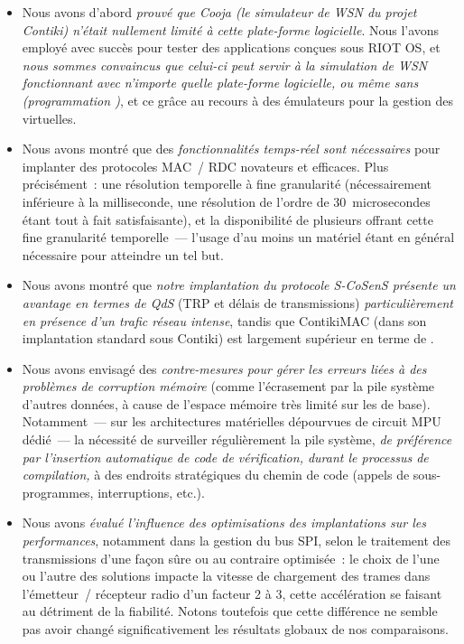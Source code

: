 \begin{itemize}

\item Nous avons d'abord \emph{prouvé que Cooja (le simulateur de WSN du
projet Contiki) n'était nullement limité à cette plate-forme logicielle}.
Nous l'avons employé avec succès pour tester des applications conçues sous
RIOT OS, et \emph{nous sommes convaincus que celui-ci peut servir à la
simulation de WSN fonctionnant avec n'importe quelle plate-forme logicielle,
ou même sans (programmation )}, et ce grâce au recours
à des émulateurs pour la gestion des  virtuelles.

\item Nous avons montré que des \emph{fonctionnalités temps-réel sont
nécessaires} pour implanter des protocoles MAC~/ RDC novateurs et
efficaces. Plus précisément~: une résolution temporelle à fine
granularité (nécessairement inférieure à la milliseconde, une résolution
de l'ordre de 30~microsecondes étant tout à fait satisfaisante), et la
disponibilité de plusieurs  offrant cette fine granularité
temporelle~--- l'usage d'au moins un  matériel étant en général
nécessaire pour atteindre un tel but.

\item Nous avons montré que \emph{notre implantation du protocole
S-CoSenS présente un avantage en termes de QdS} (TRP et délais de
transmissions) \emph{particulièrement en présence d'un trafic réseau
intense}, tandis que ContikiMAC (dans son implantation standard
sous Contiki) est largement supérieur en terme de .

\item Nous avons envisagé des \emph{contre-mesures pour gérer les erreurs
liées à des problèmes de corruption mémoire} (comme l'écrasement par
la pile système d'autres données, à cause de l'espace mémoire
très limité sur les  de base).
Notamment~--- sur les architectures matérielles dépourvues de circuit
MPU dédié~--- la nécessité de surveiller régulièrement la pile système,
\emph{de préférence par l'insertion automatique de code de vérification,
durant le processus de compilation,} à des endroits stratégiques du chemin
de code (appels de sous-programmes, interruptions, etc.).

\item Nous avons \emph{évalué l'influence des optimisations des
implantations sur les performances}, notamment dans la gestion du bus SPI,
selon le traitement des transmissions d'une façon sûre ou au contraire
optimisée~: le choix de l'une ou l'autre des solutions impacte la vitesse
de chargement des trames dans l'émetteur~/ récepteur radio d'un facteur
2 à 3, cette accélération se faisant au détriment de la fiabilité.
Notons toutefois que cette différence ne semble pas avoir changé
significativement les résultats globaux de nos comparaisons.


\end{itemize}
